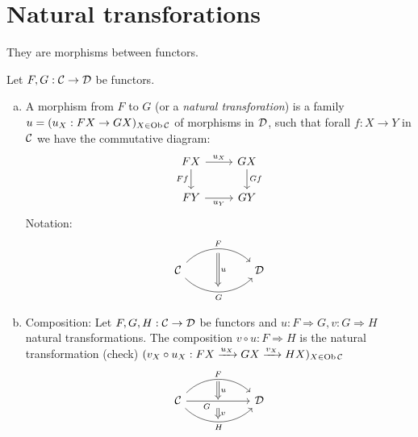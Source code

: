\documentclass[a4paper]{report}
\begin{document}
\section{Natural transforations}
They are morphisms between functors.
\begin{defi} Let $F, G: \mathcal{C} \to \mathcal{D}$ be functors.
  \begin{enumerate}[(a)]
    \item A morphism from $F$ to $G$ (or a \emph{natural transforation}) is a family $u = (u_{X}: FX \to GX)_{X \in \operatorname{Ob} \mathcal{C}}$ of morphisms in $\mathcal{D}$, such that forall $f: X \to Y$ in $\mathcal{C}$ we have the commutative diagram:
          \[\begin{tikzcd}
              FX \arrow[d, "Ff"'] \arrow[r, "u_X"] & GX \arrow[d, "Gf"] \\
FY \arrow[r, "u_Y"']                 & GY
\end{tikzcd}\]
          Notation:
          \[\begin{tikzcd}[row sep = 8]
& {} \arrow[dd, "u", Rightarrow] &    \\
\C \arrow[rr, "F", bend left=45] \arrow[rr, "G"', bend right=45] &                                & \D \\
& {}                             &
\end{tikzcd}\]
    \item Composition: Let $F, G, H: \mathcal{C} \to \mathcal{D}$ be functors and $u: F \Rightarrow G, v: G \Rightarrow H$ natural transformations. The composition $v \circ u : F \Rightarrow H$ is the natural transformation (check) $(v_{X} \circ u_{X}: FX \xrightarrow{u_{X}}GX\xrightarrow{v_{X}}HX)_{X \in \operatorname{Ob} \mathcal{C}}$
\[\begin{tikzcd}[row sep = 10]
                                                                                             & {} \arrow[d, "u", Rightarrow] &    \\
                                                                                             \C \arrow[rr, "F", bend left=45] \arrow[rr, "H"', bend right=45] \arrow[rr, "G\quad \quad "'] & {} \arrow[d, "v", Rightarrow] & \D \\
                                                                                             & {}                            &
\end{tikzcd}\]


\end{enumerate}
\end{defi}
\end{document}
